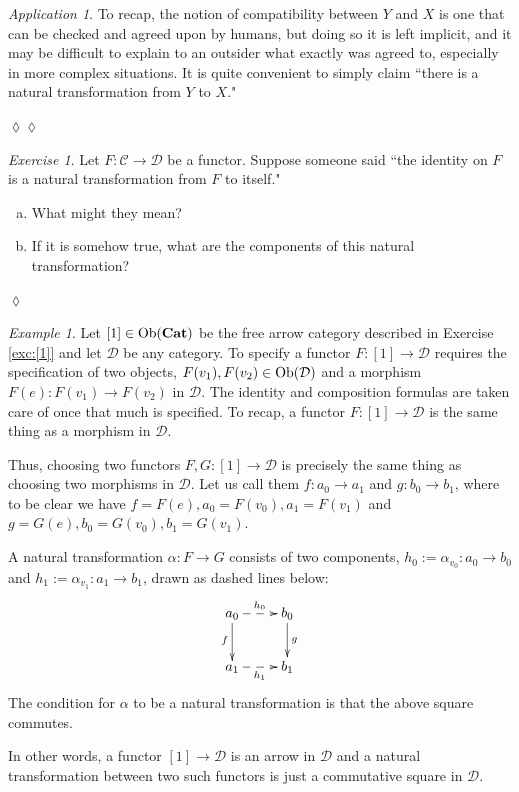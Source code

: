 \documentclass{book}
\def\tn{\textnormal}
\def\mc{\mathcal}
\def\Ob{\tn{Ob}}
\def\to{\rightarrow}
\def\taking{\colon}
\def\Cat{{\bf Cat}}
\def\mcC{\mc{C}}
\def\mcD{\mc{D}}
\theoremstyle{remark}
\newtheorem{example}[subsubsection]{Example}
\newtheorem{exc}[subsubsection]{Exercise}
\newenvironment{exercise}{\begin{exc}}{\hspace*{\fill}$\lozenge$\end{exc}}
\newtheorem{app}[subsubsection]{Application}
\newenvironment{application}{\begin{app}}{\hspace*{\fill}$\lozenge\lozenge$\end{app}}
\theoremstyle{definition}
\def\sexc{\begin{enumerate}[a.)]\setlength{\itemsep}{.1cm}\setlength{\parskip}{.1cm}\item}
\def\next{\item}
\def\endsexc{\end{enumerate}}
\begin{document}
\begin{application}
To recap, the notion of compatibility between $Y$ and $X$ is one that can be checked and agreed upon by humans, but doing so it is left implicit, and it may be difficult to explain to an outsider what exactly was agreed to, especially in more complex situations. It is quite convenient to simply claim ``there is a natural transformation from $Y$ to $X$."

\end{application}

\begin{exercise}\label{exc:id nat trans}
Let $F\taking\mcC\to\mcD$ be a functor. Suppose someone said ``the identity on $F$ is a natural transformation from $F$ to itself." \sexc What might they mean?
\next If it is somehow true, what are the components of this natural transformation?
\endsexc
\end{exercise}

\begin{example}

Let $[1]\in\Ob(\Cat)$ be the free arrow category described in Exercise \ref{exc:[1]} and let $\mcD$ be any category. To specify a functor $F\taking[1]\to\mcD$ requires the specification of two objects, $F(v_1), F(v_2)\in\Ob(\mcD)$ and a morphism $F(e)\taking F(v_1)\to F(v_2)$ in $\mcD$. The identity and composition formulas are taken care of once that much is specified. To recap, a functor $F\taking[1]\to\mcD$ is the same thing as a morphism in $\mcD$.

Thus, choosing two functors $F,G\taking[1]\to\mcD$ is precisely the same thing as choosing two morphisms in $\mcD$. Let us call them $f\taking a_0\to a_1$ and $g\taking b_0\to b_1$, where to be clear we have $f=F(e), a_0=F(v_0), a_1=F(v_1)$ and $g=G(e), b_0=G(v_0), b_1=G(v_1)$. 

A natural transformation $\alpha\taking F\to G$ consists of two components, $h_0:=\alpha_{v_0}\taking a_0\to b_0$ and $h_1:=\alpha_{v_1}\taking a_1\to b_1$, drawn as dashed lines below:
$$\xymatrix{a_0\ar@{-->}[r]^{h_0}\ar[d]_f&b_0\ar[d]^{g}\\a_1\ar@{-->}[r]_{h_1}&b_1}$$
The condition for $\alpha$ to be a natural transformation is that the above square commutes. 

In other words, a functor $[1]\to\mcD$ is an arrow in $\mcD$ and a natural transformation between two such functors is just a commutative square in $\mcD$.

\end{example}
\end{document}
